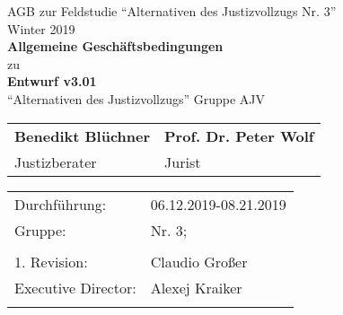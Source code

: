 \documentclass[a4paper, 12pt]{scrartcl}
\begin{document}
    \begin{titlepage}
        \begin{center}
            
	      \large {AGB zur Feldstudie \enquote{Alternativen des Justizvollzugs Nr. 3}} \\
            Winter 2019 \\
            \vspace{3cm}
            \textbf{ \Huge Allgemeine Gesch\"aftsbedingungen} \\
            \vspace{0.5cm}
            \large zu \\
            \vspace{1.5cm}
            \textbf{ \Large Entwurf v3.01} \\
            \large \enquote{Alternativen des Justizvollzugs} Gruppe AJV

            \vspace{3cm}
            \setlength\extrarowheight{3pt}
            \begin{tabularx}{\textwidth}{CC}
            \textbf{Benedikt Bl\"uchner} & \textbf{Prof. Dr. Peter Wolf} \\
            Justizberater & Jurist\\
            \end{tabularx}
           
            \vspace{4cm}
            
            \begin{tabularx}{\textwidth}{XX}
                Durchführung: & 06.12.2019-08.21.2019 \\ 
                Gruppe: & Nr. 3;  \\ \\
                1. Revision: & Claudio Gro{\ss}er \\
                Executive Director: & Alexej Kraiker  \\ \\
            \end{tabularx}
         \end{center}
    \end{titlepage}
\end{document}
